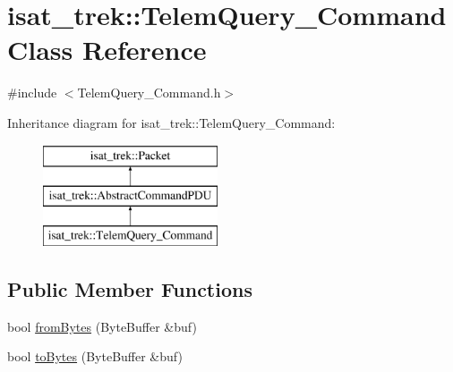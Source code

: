 \hypertarget{classisat__trek_1_1_telem_query___command}{}\section{isat\+\_\+trek\+:\+:Telem\+Query\+\_\+\+Command Class Reference}
\label{classisat__trek_1_1_telem_query___command}


{\ttfamily \#include $<$Telem\+Query\+\_\+\+Command.\+h$>$}

Inheritance diagram for isat\+\_\+trek\+:\+:Telem\+Query\+\_\+\+Command\+:\begin{figure}[H]
\begin{center}
\leavevmode
\includegraphics[height=3.000000cm]{classisat__trek_1_1_telem_query___command}
\end{center}
\end{figure}
\subsection*{Public Member Functions}
\begin{DoxyCompactItemize}
\item 
bool \hyperlink{classisat__trek_1_1_telem_query___command_acb705ce25c788761979babba379b5eee}{from\+Bytes} (Byte\+Buffer \&buf)
\item 
bool \hyperlink{classisat__trek_1_1_telem_query___command_a1317d998b95812f8b8ea86da4ee8bae3}{to\+Bytes} (Byte\+Buffer \&buf)
\end{DoxyCompactItemize}

